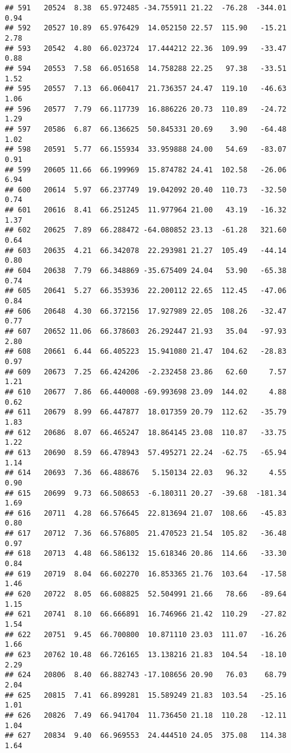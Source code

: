 \documentclass[]{article}
\begin{document}
\begin{verbatim}
## 591   20524  8.38  65.972485 -34.755911 21.22  -76.28  -344.01  0.94
## 592   20527 10.89  65.976429  14.052150 22.57  115.90   -15.21  2.78
## 593   20542  4.80  66.023724  17.444212 22.36  109.99   -33.47  0.88
## 594   20553  7.58  66.051658  14.758288 22.25   97.38   -33.51  1.52
## 595   20557  7.13  66.060417  21.736357 24.47  119.10   -46.63  1.06
## 596   20577  7.79  66.117739  16.886226 20.73  110.89   -24.72  1.29
## 597   20586  6.87  66.136625  50.845331 20.69    3.90   -64.48  1.02
## 598   20591  5.77  66.155934  33.959888 24.00   54.69   -83.07  0.91
## 599   20605 11.66  66.199969  15.874782 24.41  102.58   -26.06  6.94
## 600   20614  5.97  66.237749  19.042092 20.40  110.73   -32.50  0.74
## 601   20616  8.41  66.251245  11.977964 21.00   43.19   -16.32  1.37
## 602   20625  7.89  66.288472 -64.080852 23.13  -61.28   321.60  0.64
## 603   20635  4.21  66.342078  22.293981 21.27  105.49   -44.14  0.80
## 604   20638  7.79  66.348869 -35.675409 24.04   53.90   -65.38  0.74
## 605   20641  5.27  66.353936  22.200112 22.65  112.45   -47.06  0.84
## 606   20648  4.30  66.372156  17.927989 22.05  108.26   -32.47  0.77
## 607   20652 11.06  66.378603  26.292447 21.93   35.04   -97.93  2.80
## 608   20661  6.44  66.405223  15.941080 21.47  104.62   -28.83  0.97
## 609   20673  7.25  66.424206  -2.232458 23.86   62.60     7.57  1.21
## 610   20677  7.86  66.440008 -69.993698 23.09  144.02     4.88  0.62
## 611   20679  8.99  66.447877  18.017359 20.79  112.62   -35.79  1.83
## 612   20686  8.07  66.465247  18.864145 23.08  110.87   -33.75  1.22
## 613   20690  8.59  66.478943  57.495271 22.24  -62.75   -65.94  1.14
## 614   20693  7.36  66.488676   5.150134 22.03   96.32     4.55  0.90
## 615   20699  9.73  66.508653  -6.180311 20.27  -39.68  -181.34  1.69
## 616   20711  4.28  66.576645  22.813694 21.07  108.66   -45.83  0.80
## 617   20712  7.36  66.576805  21.470523 21.54  105.82   -36.48  0.97
## 618   20713  4.48  66.586132  15.618346 20.86  114.66   -33.30  0.84
## 619   20719  8.04  66.602270  16.853365 21.76  103.64   -17.58  1.46
## 620   20722  8.05  66.608825  52.504991 21.66   78.66   -89.64  1.15
## 621   20741  8.10  66.666891  16.746966 21.42  110.29   -27.82  1.54
## 622   20751  9.45  66.700800  10.871110 23.03  111.07   -16.26  1.66
## 623   20762 10.48  66.726165  13.138216 21.83  104.54   -18.10  2.29
## 624   20806  8.40  66.882743 -17.108656 20.90   76.03    68.79  2.04
## 625   20815  7.41  66.899281  15.589249 21.83  103.54   -25.16  1.01
## 626   20826  7.49  66.941704  11.736450 21.18  110.28   -12.11  1.04
## 627   20834  9.40  66.969553  24.444510 24.05  375.08   114.38  1.64

\end{verbatim}
\end{document}
